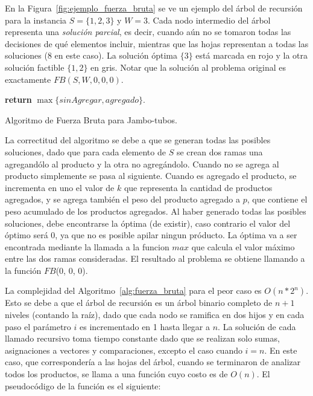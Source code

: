 \documentclass[10pt,a4paper]{article}
\begin{document}
En la Figura~\ref{fig:ejemplo_fuerza_bruta} se ve un ejemplo del árbol de recursión para la instancia $S =\{1, 2, 3\}$ y $W=3$. Cada nodo intermedio del árbol representa una \emph{solución parcial}, es decir, cuando aún no se tomaron todas las decisiones de qué elementos incluir, mientras que las hojas representan a todas las soluciones (8 en este caso). La solución óptima $\{3\}$ está marcada en rojo y la otra solución factible $\{1, 2\}$ en gris. Notar que la solución al problema original es exactamente $FB(S, W, 0, 0, 0)$.

\begin{algorithm}
\begin{algorithmic}[1]
    \EndIf
    \State \textbf{return} $\max \{ sinAgregar,agregado \}$.
\EndFunction
\end{algorithmic}
\caption{Algoritmo de Fuerza Bruta para Jambo-tubos.}
\label{alg:fuerza_bruta}
\end{algorithm}

La correctitud del algoritmo se debe a que se generan todas las posibles soluciones, dado que para cada elemento de $S$ se crean dos ramas una agregandólo al producto y la otra no agregándolo. Cuando no se agrega al producto simplemente se pasa al siguiente. Cuando es agregado el producto, se incrementa en uno el valor de $k$ que representa la cantidad de productos agregados, y se agrega también el peso del producto agregado a $p$, que contiene el peso acumulado de los productos agregados. Al haber generado todas las posibles soluciones, debe encontrarse la óptima (de existir), caso contrario el valor del óptimo será $0$, ya que no es posible apilar ningun próducto. La óptima va a ser encontrada mediante la llamada a la funcion $max$ que calcula el valor máximo entre las dos ramas consideradas. El resultado al problema se obtiene llamando a la función $FB$($0$, $0$, $0$).

La complejidad del Algoritmo~\ref{alg:fuerza_bruta} para el peor caso es $O(n*2^n)$. Esto se debe a que el árbol de recursión es un árbol binario completo de $n+1$ niveles (contando la raíz), dado que cada nodo se ramifica en dos hijos y en cada paso el parámetro $i$ es incrementado en 1 hasta llegar a $n$. La solución de cada llamado recursivo toma tiempo constante dado que se realizan solo sumas, asignaciones a vectores y comparaciones, excepto el caso cuando $i = n$. En este caso, que correspondería a las hojas del árbol, cuando se terminaron de analizar todos los productos, se llama a una función cuyo costo es de $O(n)$. El pseudocódigo de la función es el siguiente:
\end{document}
